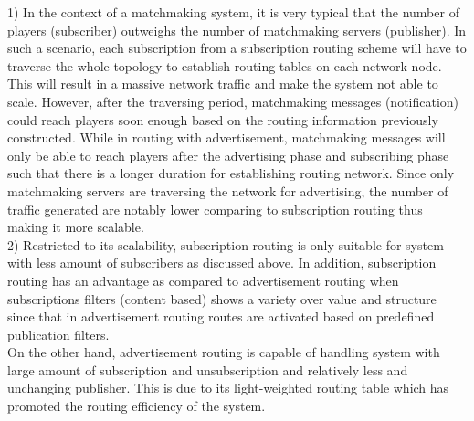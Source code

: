 1) In the context of a matchmaking system, it is very typical that the number of players (subscriber) outweighs the number of matchmaking servers (publisher). In such a scenario, each subscription from a subscription routing scheme will have to traverse the whole topology to establish routing tables on each network node. This will result in a massive network traffic and make the system not able to scale. However, after the traversing period, matchmaking messages (notification) could reach players soon enough based on the routing information previously constructed. While in routing with advertisement, matchmaking messages will only be able to reach players after the advertising phase and subscribing phase such that there is a longer duration for establishing routing network. Since only matchmaking servers are traversing the network for advertising, the number of traffic generated are notably lower comparing to subscription routing thus making it more scalable.\\

2) Restricted to its scalability, subscription routing is only suitable for system with less amount of subscribers as discussed above. In addition, subscription routing has an advantage as compared to advertisement routing when subscriptions filters (content based) shows a variety over value and structure since that in advertisement routing routes are activated based on predefined publication filters.\\
On the other hand, advertisement routing is capable of handling system with large amount of subscription and unsubscription and relatively less and unchanging publisher. This is due to its light-weighted routing table which has promoted the routing efficiency of the system.\\



